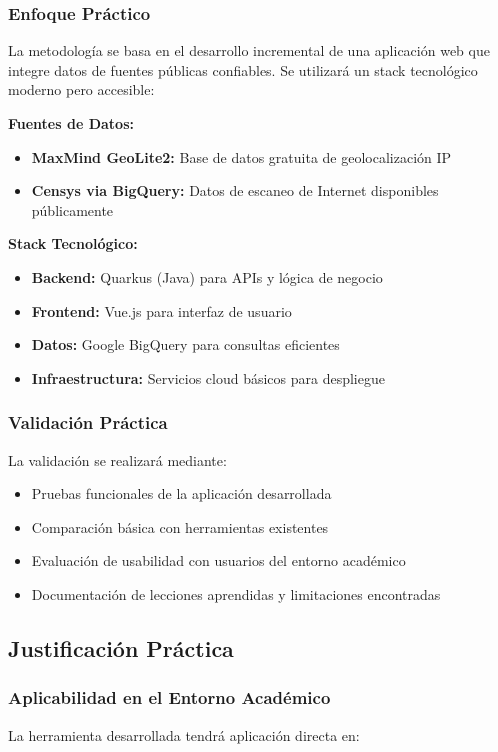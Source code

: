 \subsubsection{Enfoque Práctico}
La metodología se basa en el desarrollo incremental de una aplicación web que integre datos de fuentes públicas confiables. Se utilizará un stack tecnológico moderno pero accesible:

\textbf{Fuentes de Datos:}
\begin{itemize}
    \item \textbf{MaxMind GeoLite2:} Base de datos gratuita de geolocalización IP
    \item \textbf{Censys via BigQuery:} Datos de escaneo de Internet disponibles públicamente
\end{itemize}

\textbf{Stack Tecnológico:}
\begin{itemize}
    \item \textbf{Backend:} Quarkus (Java) para APIs y lógica de negocio
    \item \textbf{Frontend:} Vue.js para interfaz de usuario
    \item \textbf{Datos:} Google BigQuery para consultas eficientes
    \item \textbf{Infraestructura:} Servicios cloud básicos para despliegue
\end{itemize}

\subsubsection{Validación Práctica}
La validación se realizará mediante:
\begin{itemize}
    \item Pruebas funcionales de la aplicación desarrollada
    \item Comparación básica con herramientas existentes
    \item Evaluación de usabilidad con usuarios del entorno académico
    \item Documentación de lecciones aprendidas y limitaciones encontradas
\end{itemize}

\subsection{Justificación Práctica}

\subsubsection{Aplicabilidad en el Entorno Académico}
La herramienta desarrollada tendrá aplicación directa en:

